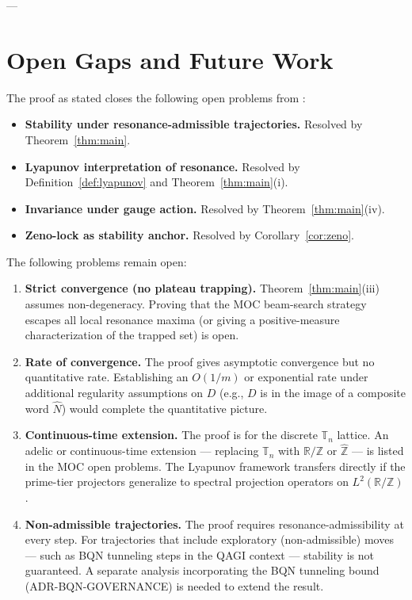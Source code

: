\documentclass[11pt]{amsart}
\newcommand{\bN}{\widehat{N}}
\newcommand{\R}{\mathbb{R}}
\newcommand{\Z}{\mathbb{Z}}
\newcommand{\Tn}{\mathbb{T}_n}
\begin{document}
---

\section{Open Gaps and Future Work}

The proof as stated closes the following open problems from \cite[Section 6]{MOC2026}:
\begin{itemize}
  \item \textbf{Stability under resonance-admissible trajectories.} Resolved by Theorem~\ref{thm:main}.
  \item \textbf{Lyapunov interpretation of resonance.} Resolved by Definition~\ref{def:lyapunov} and Theorem~\ref{thm:main}(i).
  \item \textbf{Invariance under gauge action.} Resolved by Theorem~\ref{thm:main}(iv).
  \item \textbf{Zeno-lock as stability anchor.} Resolved by Corollary~\ref{cor:zeno}.
\end{itemize}

The following problems remain open:
\begin{enumerate}
  \item \textbf{Strict convergence (no plateau trapping).} Theorem~\ref{thm:main}(iii) assumes non-degeneracy. Proving that the MOC beam-search strategy escapes all local resonance maxima (or giving a positive-measure characterization of the trapped set) is open.
  \item \textbf{Rate of convergence.} The proof gives asymptotic convergence but no quantitative rate. Establishing an $O(1/m)$ or exponential rate under additional regularity assumptions on $D$ (e.g., $D$ is in the image of a composite word $\bN$) would complete the quantitative picture.
  \item \textbf{Continuous-time extension.} The proof is for the discrete $\Tn$ lattice. An adelic or continuous-time extension — replacing $\Tn$ with $\R/\Z$ or $\hat{\Z}$ — is listed in the MOC open problems. The Lyapunov framework transfers directly if the prime-tier projectors generalize to spectral projection operators on $L^2(\R/\Z)$.
  \item \textbf{Non-admissible trajectories.} The proof requires resonance-admissibility at every step. For trajectories that include exploratory (non-admissible) moves — such as BQN tunneling steps in the QAGI context — stability is not guaranteed. A separate analysis incorporating the BQN tunneling bound (ADR-BQN-GOVERNANCE) is needed to extend the result.
\end{enumerate}
\end{document}
